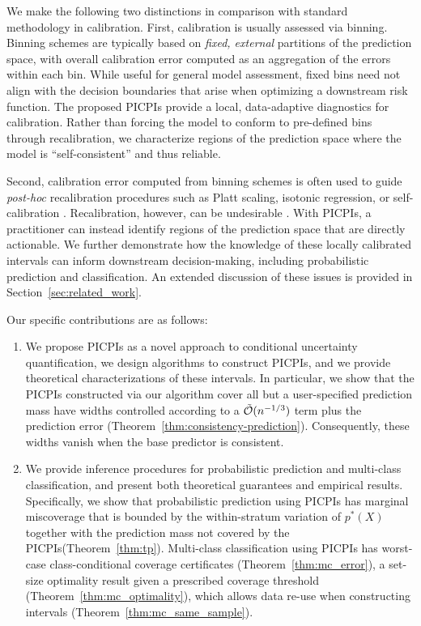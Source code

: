 \documentclass[11pt]{article}
\theoremstyle{statplain}
\theoremstyle{statdefinition}
\newcommand{\0}{\mathbf{0}}
\newcommand{\bigO}{\mathcal{O}}
\newcommand{\titleShorts}{PICPIs\xspace}
\begin{document}
We make the following two distinctions in comparison with standard methodology in calibration.
First, calibration is usually assessed via binning. 
Binning schemes are typically based on \emph{fixed, external} partitions of the prediction space, with overall calibration error computed as an aggregation of the errors within each bin.
While useful for general model assessment, fixed bins need not align with the decision boundaries that arise when optimizing a downstream risk function. 
The proposed \titleShorts provide a local, data-adaptive diagnostics for  calibration.
Rather than forcing the model to conform to pre-defined bins through recalibration, we characterize regions of the prediction space where the model is  ``self-consistent'' and thus reliable. 

Second, calibration error computed from binning schemes is often used to guide \emph{post-hoc} recalibration procedures such as Platt scaling, isotonic regression, or self-calibration \citep{platt1999probabilistic,  van2024self,berta2024classifier}. 
Recalibration, however, can be undesirable \citep{guo2017calibration, pleiss2017fairness, carriero2025harms}. 
With \titleShorts, a practitioner can instead identify regions of the prediction space that are directly actionable. We further demonstrate how the knowledge of these locally calibrated intervals can inform downstream decision-making, including probabilistic prediction and classification.
An extended discussion of these issues is provided in Section~\ref{sec:related_work}.



Our specific contributions are as follows: 
\begin{enumerate}
    \item We propose \titleShorts as a novel approach to conditional uncertainty quantification, we design algorithms to construct \titleShorts, and we provide theoretical characterizations of these intervals. In particular, we show that  the \titleShorts constructed via our algorithm cover all but a user-specified prediction mass have widths controlled according to a $\Tilde{\bigO}(n^{-1/3})$ term plus the prediction error (Theorem~\ref{thm:consistency-prediction}). Consequently, these widths vanish when the base predictor is consistent.
    \item We provide inference procedures for probabilistic prediction and multi-class classification, and present both theoretical guarantees and empirical results. Specifically, we show that probabilistic prediction using \titleShorts has marginal miscoverage that is bounded by the within-stratum variation of $p^*(X)$ together with the prediction mass not covered by the \titleShorts (Theorem~\ref{thm:tp}).
Multi-class classification using \titleShorts has worst-case class-conditional coverage certificates (Theorem~\ref{thm:mc_error}), a set-size optimality result given a prescribed coverage threshold (Theorem~\ref{thm:mc_optimality}), which allows data re-use when constructing intervals (Theorem~\ref{thm:mc_same_sample}).
\end{enumerate}
 
\end{document}
